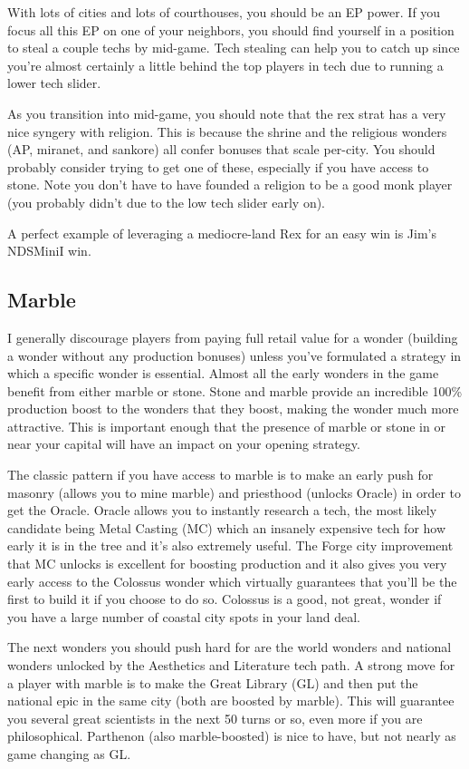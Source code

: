 \documentclass[10pt]{article}
\begin{document}
With lots of cities and lots of courthouses, you should be an EP
power. If you focus all this EP on one of your neighbors, you should
find yourself in a position to steal a couple techs by mid-game. Tech
stealing can help you to catch up since you're almost certainly a
little behind the top players in tech due to running a lower tech
slider.

As you transition into mid-game, you should note that the rex strat
has a very nice syngery with religion. This is because the shrine and
the religious wonders (AP, miranet, and sankore) all confer bonuses
that scale per-city. You should probably consider trying to get one of
these, especially if you have access to stone. Note you don't have to
have founded a religion to be a good monk player (you probably didn't
due to the low tech slider early on).

A perfect example of leveraging a mediocre-land Rex for an easy win is Jim's NDSMiniI win.

\subsection*{Marble}

I generally discourage players from paying full retail value for a
wonder (building a wonder without any production bonuses) unless
you've formulated a strategy in which a specific wonder is essential.
Almost all the early wonders in the game benefit from either marble or
stone. Stone and marble provide an incredible 100\% production boost
to the wonders that they boost, making the wonder much more
attractive. This is important enough that the presence of marble or
stone in or near your capital will have an impact on your opening
strategy.

The classic pattern if you have access to marble is to make an early
push for masonry (allows you to mine marble) and priesthood (unlocks
Oracle) in order to get the Oracle. Oracle allows you to instantly
research a tech, the most likely candidate being Metal Casting (MC)
which an insanely expensive tech for how early it is in the tree and
it's also extremely useful. The Forge city improvement that MC unlocks
is excellent for boosting production and it also gives you very early
access to the Colossus wonder which virtually guarantees that you'll
be the first to build it if you choose to do so. Colossus is a good,
not great, wonder if you have a large number of coastal city spots in
your land deal.

The next wonders you should push hard for are the world wonders and
national wonders unlocked by the Aesthetics and Literature tech
path. A strong move for a player with marble is to make the Great
Library (GL) and then put the national epic in the same city (both are
boosted by marble). This will guarantee you several great scientists
in the next 50 turns or so, even more if you are
philosophical. Parthenon (also marble-boosted) is nice to have, but
not nearly as game changing as GL.
\end{document}
